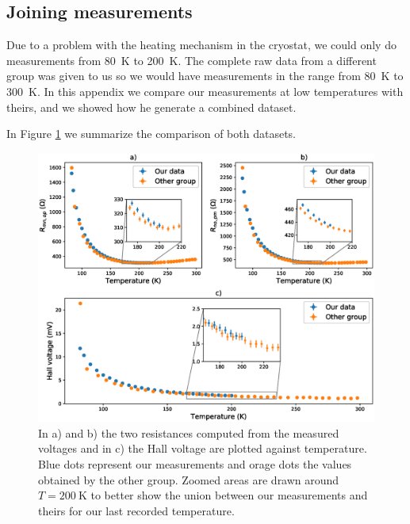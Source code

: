 \documentclass[11pt,a4paper]{article}
\begin{document}
\newpage
\begin{appendices}
\section{Joining measurements}\label{app:dataset}
Due to a problem with the heating mechanism in the cryostat, we could only do measurements from \SI{80}{\kelvin} to \SI{200}{\kelvin}. The complete raw data from a different group was given to us so we would have measurements in the range from \SI{80}{\kelvin} to \SI{300}{\kelvin}. In this appendix we compare our measurements at low temperatures with theirs, and we showed how he generate a combined dataset.

In Figure \ref{fig:comparison_datasets} we summarize the comparison of both datasets.

\begin{figure}[ht]
\centering
\includegraphics[width=\textwidth]{comparison_datasets.eps}
\caption{In a) and b) the two resistances computed from the measured voltages and in c) the Hall voltage are plotted against temperature. Blue dots represent our measurements and orage dots the values obtained by the other group. Zoomed areas are drawn around $T=\SI{200}{\kelvin}$ to better show the union between our measurements and theirs for our last recorded temperature.}
\label{fig:comparison_datasets}
\end{figure}

\end{appendices}
\end{document}

